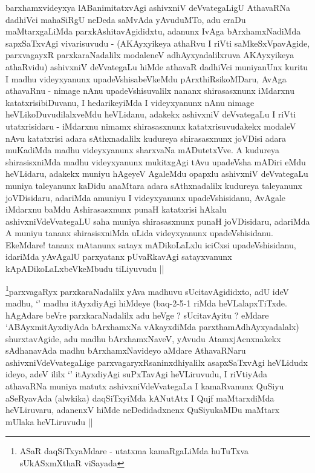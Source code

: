 \begin{artha}
barxhamxvideyxya lABanimitatxvAgi ashivxniV deVvategaLigU AthavaRNa
dadhiVci mahaSiRgU neDeda saMvAda yAvuduMTo, adu eraDu maMtarxgaLiMda
parxkAshitavAgididxtu, adanunx IvAga bArxhamxNadiMda sapxSaTxvAgi
vivarisuvudu - (AKAyxyikeya athaRvu I riVti saMkeSxVpavAgide,
parxvagayxR parxkaraNadalilx modaleneV adhAyxyadalilxruva AKAyxyikeya
athaRvidu)  ashivxniV deVvategaLu hiMde athavaR dadhiVci muniyanUnx
kuritu I madhu videyxyanunx upadeVshisabeVkeMdu pArxthiRsikoMDaru,
AvAga athavaRnu - nimage nAnu upadeVshisuvalilx nananx shirasasxnunx
iMdarxnu katatxrisibiDuvanu, I hedarikeyiMda I videyxyanunx nAnu
nimage heVLikoDuvudilalxveMdu heVLidanu, adakekx ashivxniV deVvategaLu
I riVti utatxrisidaru - iMdarxnu nimamx shirasasxnunx
katatxrisuvudakekx modaleV nAvu katatxrisi adara sAthxnadalilx
kudureya shirasasxnunx joVDisi adara muKadiMda madhu videyxyanunx
sharxvaNa mADutetxVve. A kudureya shirasisxniMda madhu videyxyanunx
mukitxgAgi tAvu upadeVsha mADiri eMdu heVLidaru, adakekx muniyu
hAgeyeV AgaleMdu opapxlu ashivxniV deVvategaLu muniya taleyanunx
kaDidu anaMtara adara sAthxnadalilx kudureya taleyanunx joVDisidaru,
adariMda amuniyu I videyxyanunx upadeVshisidanu, AvAgale iMdarxnu
baMdu Ashirasasxnunx punaH katatxrisi hAkalu ashivxniVdeVvategaLU saha
muniya shirasasxnunx punaH joVDisidaru, adariMda  A muniyu tananx
shirasisxniMda uLida videyxyanunx upadeVshisidanu. EkeMdare! tananx
mAtanunx satayx mADikoLaLxlu iciCxsi upadeVshisidanu, idariMda
yAvAgalU parxyatanx pUvaRkavAgi satayxvanunx kApADikoLaLxbeVkeMbudu
tiLiyuvudu ||
\end{artha}


\begin{artha}
\footnote[1]{ASaR daqSiTxyaMdare - utatxma kamaRgaLiMda huTuTxva
  sUkASxmXthaR viSayada}parxvagaRyx parxkaraNadalilx yAva madhuvu
sUcitavAgididxto, adU ideV madhu, `\stext' madhu itAyxdiyAgi hiMdeye
(baq-2-5-1 riMda heVLalapxTiTxde. hAgAdare beVre parxkaraNadalilx adu
heVge ? sUcitavAyitu ? eMdare `ABAyxmitAyxdiyAda bArxhamxNa
vAkayxdiMda parxthamAdhAyxyadalalx) shurxtavAgide, adu madhu
bArxhamxNaveV, yAvudu AtamxjAcnxnakekx sAdhanavAda madhu
bArxhamxNavideyo aMdare AthavaRNaru ashivxniVdeVvategaLige
parxvagaryxRsaninxdhiyalilx asapxSaTxvAgi heVLidudx ideyo, adeV ililx
`\stext' itAyxdiyAgi suPxTavAgi heVLiruvudu, I riVtiyAda athavaRNa
muniya matutx ashivxniVdeVvategaLa I kamaRvanunx QuSiyu aSeRyavAda
(alwkika) daqSiTxyiMda kANutAtx I Qujf maMtarxdiMda heVLiruvaru,
adanenxV hiMde neDedidadxnenx QuSiyukaMDu maMtarx mUlaka heVLiruvudu ||
\end{artha}

